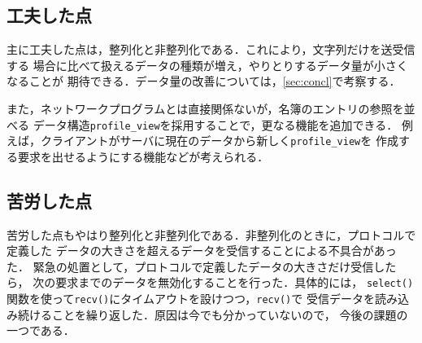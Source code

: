 \documentclass[a4j,10pt]{jarticle}
\begin{document}
\subsection{工夫した点}
主に工夫した点は，整列化と非整列化である．これにより，文字列だけを送受信する
場合に比べて扱えるデータの種類が増え，やりとりするデータ量が小さくなることが
期待できる．データ量の改善については，\ref{sec:concl}で考察する．

また，ネットワークプログラムとは直接関係ないが，名簿のエントリの参照を並べる
データ構造\verb|profile_view|を採用することで，更なる機能を追加できる．
例えば，クライアントがサーバに現在のデータから新しく\verb|profile_view|を
作成する要求を出せるようにする機能などが考えられる．

\subsection{苦労した点}
苦労した点もやはり整列化と非整列化である．非整列化のときに，プロトコルで定義した
データの大きさを超えるデータを受信することによる不具合があった．
緊急の処置として，プロトコルで定義したデータの大きさだけ受信したら，
次の要求までのデータを無効化することを行った．具体的には，
\verb|select()|関数を使って\verb|recv()|にタイムアウトを設けつつ，\verb|recv()|で
受信データを読み込み続けることを繰り返した．原因は今でも分かっていないので，
今後の課題の一つである．
\end{document}
